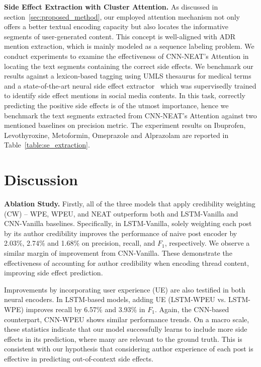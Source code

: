 \documentclass{bmcart}
\begin{document}
{\bf Side Effect Extraction with Cluster Attention.}\label{subsec:se_extraction}
As discussed in section~\ref{sec:proposed_method}, our employed attention mechanism not only offers a better textual encoding capacity but also locates the informative segments of user-generated content. This concept is well-aligned with ADR mention extraction, which is mainly modeled as a sequence labeling problem. We conduct experiments to examine the effectiveness of CNN-NEAT's Attention in locating the text segments containing the correct side effects. We benchmark our results against a lexicon-based tagging using UMLS thesaurus for medical terms~\cite{bodenreider2004unified} and a state-of-the-art neural side effect extractor~\cite{ding2018attentive} which was supervisedly trained to identify side effect mentions in social media contents. In this task, correctly predicting the positive side effects is of the utmost importance, hence we benchmark the text segments extracted from CNN-NEAT's Attention against two mentioned baselines on precision metric. The experiment results on Ibuprofen, Levothyroxine, Metoformin, Omeprazole and Alprazolam are reported in Table~\ref{table:se_extraction}.

\section{Discussion}\label{sec:discussion}
{\bf Ablation Study.}
Firstly, all of the three models that
apply credibility weighting (CW) -- WPE, WPEU, and NEAT
outperform both and LSTM-Vanilla and CNN-Vanilla baselines.
Specifically, in LSTM-Vanilla, solely weighting each post 
by its author credibility improves the performance of naive post encoder by 2.03\%, 2.74\% and 1.68\% on precision, recall, and $F_1$, respectively. We observe a similar margin of improvement from CNN-Vanilla. These demonstrate the effectiveness of accounting for author credibility when encoding thread content, improving side effect prediction.

Improvements by incorporating user experience (UE) are 
also testified in both neural encoders. In LSTM-based models, adding UE (LSTM-WPEU vs. LSTM-WPE) improves recall
by 6.57\% and 3.93\% in $F_1$.  Again, the CNN-based counterpart, CNN-WPEU shows similar performance trends.  On a macro scale, these statistics indicate 
that our model successfully learns to include more side effects in its prediction,
where many are relevant to the ground truth.  This is consistent with
our hypothesis that considering author experience of each post is effective in predicting out-of-context side effects.
\end{document}
